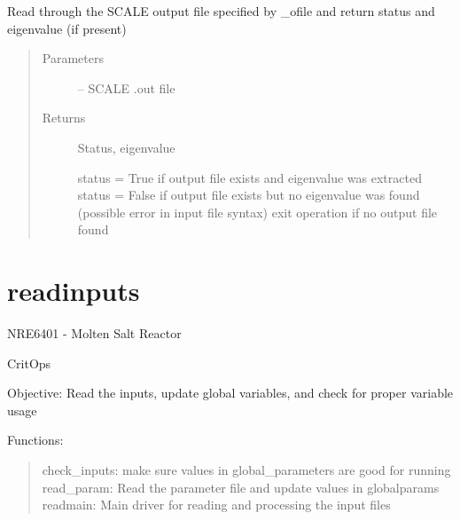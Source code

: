 \documentclass[letterpaper,10pt,english]{sphinxmanual}
\begin{document}
\begin{fulllineitems}
\label{\detokenize{iterator:critops.iterator.parse_scale_out_eig}}
Read through the SCALE output file specified by \_ofile and return status and eigenvalue (if present)
\begin{quote}\begin{description}
\item[{Parameters}] \leavevmode
{} -- SCALE .out file

\item[{Returns}] \leavevmode

Status, eigenvalue

status = True if output file exists and eigenvalue was extracted
status = False if output file exists but no eigenvalue was found (possible error in input file syntax)
exit operation if no output file found


\end{description}\end{quote}

\end{fulllineitems}



\chapter{readinputs}
\label{\detokenize{readinputs:module-critops.readinputs}}\label{\detokenize{readinputs:readinputs}}\label{\detokenize{readinputs::doc}}
NRE6401 - Molten Salt Reactor

CritOps

Objective: Read the inputs, update global variables, and check for proper variable usage

Functions:
\begin{quote}

check\_inputs: make sure values in global\_parameters are good for running
read\_param: Read the parameter file and update values in globalparams
readmain: Main driver for reading and processing the input files
\end{quote}
\end{document}
